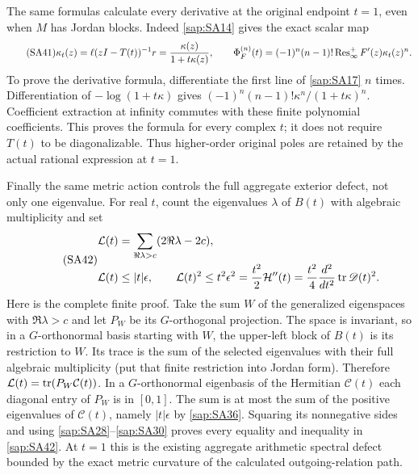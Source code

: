 The same formulas calculate every derivative at the
original endpoint $t=1$, even when $M$ has Jordan blocks.
Indeed \eqref{sap:SA14} gives the exact scalar map
\begin{equation}\tag{SA41}\label{sap:SA41}
\kappa_t(z)=\ell(zI-T(t))^{-1}r
=\frac{\kappa(z)}{1+t\kappa(z)},\qquad
\Phi_F^{(n)}(t)=(-1)^n(n-1)!
\operatorname{Res}_\infty^+F'(z)\kappa_t(z)^n .
\end{equation}
To prove the derivative formula, differentiate the first
line of \eqref{sap:SA17} $n$ times. Differentiation of
$-\log(1+t\kappa)$ gives
$(-1)^n(n-1)!\kappa^n/(1+t\kappa)^n$.
Coefficient extraction at infinity commutes with these
finite polynomial coefficients. This proves the formula
for every complex $t$; it does not require $T(t)$ to be
diagonalizable. Thus higher-order original poles are
retained by the actual rational expression at $t=1$.

Finally the same metric action controls the full
aggregate exterior defect, not only one eigenvalue.
For real $t$, count the eigenvalues $\lambda$ of $B(t)$
with algebraic multiplicity and set
\begin{equation}\tag{SA42}\label{sap:SA42}
\begin{split}
\mathcal L(t)&=\sum_{\Re\lambda>c}
                   (2\Re\lambda-2c),\\
\mathcal L(t)&\leq |t|\epsilon,\qquad
\mathcal L(t)^2\leq
t^2\epsilon^2
=\frac{t^2}{2}\mathcal H''(t)
=\frac{t^2}{4}\frac{d^2}{dt^2}\operatorname{tr}\mathscr D(t)^2.
\end{split}
\end{equation}
Here is the complete finite proof. Take the sum $W$ of
the generalized eigenspaces with $\Re\lambda>c$ and
let $P_W$ be its $G$-orthogonal projection. The space
is invariant, so in a $G$-orthonormal basis starting
with $W$, the upper-left block of $B(t)$ is its
restriction to $W$. Its trace is the sum of the
selected eigenvalues with their full algebraic
multiplicity (put that finite restriction into Jordan
form). Therefore
$\mathcal L(t)=\operatorname{tr}(P_W\mathcal C(t))$.
In a $G$-orthonormal eigenbasis of the Hermitian
$\mathcal C(t)$ each diagonal entry of $P_W$ is in
$[0,1]$. The sum is at most the sum of the positive
eigenvalues of $\mathcal C(t)$, namely $|t|\epsilon$
by \eqref{sap:SA36}. Squaring its nonnegative sides and
using \eqref{sap:SA28}--\eqref{sap:SA30} proves every equality
and inequality in \eqref{sap:SA42}. At $t=1$ this is the
existing aggregate arithmetic spectral defect
bounded by the exact metric curvature of the
calculated outgoing-relation path.

